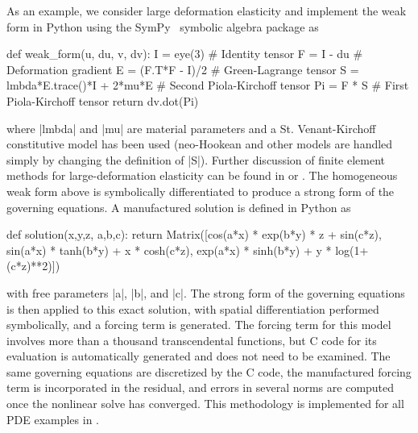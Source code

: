 As an example, we consider large deformation elasticity and implement the weak form in Python using the SymPy~\citep{sympy-web-page} symbolic algebra package as
\begin{pythoncode}
  def weak_form(u, du, v, dv):
    I = eye(3)                      # Identity tensor
    F = I - du                      # Deformation gradient
    E = (F.T*F - I)/2               # Green-Lagrange tensor
    S = lmbda*E.trace()*I + 2*mu*E  # Second Piola-Kirchoff tensor
    Pi = F * S                      # First Piola-Kirchoff tensor
    return dv.dot(Pi)
\end{pythoncode}
where \pyverb|lmbda| and \pyverb|mu| are material parameters and a St. Venant-Kirchoff constitutive model has been used (neo-Hookean and other models are handled simply by changing the definition of \pyverb|S|).
Further discussion of finite element methods for large-deformation elasticity can be found in \citet{wriggers2008nonlinear} or \citet{bathe1996finite}.
The homogeneous weak form above is symbolically differentiated to produce a strong form of the governing equations.
A manufactured solution is defined in Python as
\begin{pythoncode}
  def solution(x,y,z, a,b,c):
    return Matrix([cos(a*x) * exp(b*y) * z + sin(c*z),
                   sin(a*x) * tanh(b*y) + x * cosh(c*z),
                   exp(a*x) * sinh(b*y) + y * log(1+(c*z)**2)])
\end{pythoncode}
with free parameters \pyverb|a|, \pyverb|b|, and \pyverb|c|.
The strong form of the governing equations is then applied to this exact solution, with spatial differentiation performed symbolically, and a forcing term is generated.
The forcing term for this model involves more than a thousand transcendental functions, but C code for its evaluation is automatically generated and does not need to be examined.
The same governing equations are discretized by the C code, the manufactured forcing term is incorporated in the residual, and errors in several norms are computed once the nonlinear solve has converged.
This methodology is implemented for all PDE examples in {\Dohp}.

